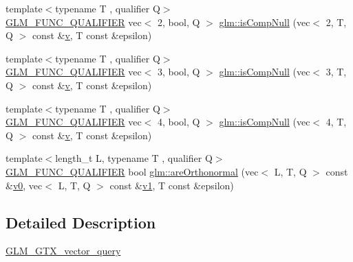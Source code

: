 \begin{DoxyCompactItemize}
\item 
{\footnotesize template$<$typename T , qualifier Q$>$ }\\\hyperlink{setup_8hpp_a33fdea6f91c5f834105f7415e2a64407}{G\+L\+M\+\_\+\+F\+U\+N\+C\+\_\+\+Q\+U\+A\+L\+I\+F\+I\+ER} vec$<$ 2, bool, Q $>$ \hyperlink{namespaceglm_aa194d2ce350422b8c307778002a5429d}{glm\+::is\+Comp\+Null} (vec$<$ 2, T, Q $>$ const \&\hyperlink{_s_d_l__opengl_8h_a10a82eabcb59d2fcd74acee063775f90}{v}, T const \&epsilon)
\item 
{\footnotesize template$<$typename T , qualifier Q$>$ }\\\hyperlink{setup_8hpp_a33fdea6f91c5f834105f7415e2a64407}{G\+L\+M\+\_\+\+F\+U\+N\+C\+\_\+\+Q\+U\+A\+L\+I\+F\+I\+ER} vec$<$ 3, bool, Q $>$ \hyperlink{namespaceglm_a3c5f0ad7464dde1b9daa5b5a9f3141ee}{glm\+::is\+Comp\+Null} (vec$<$ 3, T, Q $>$ const \&\hyperlink{_s_d_l__opengl_8h_a10a82eabcb59d2fcd74acee063775f90}{v}, T const \&epsilon)
\item 
{\footnotesize template$<$typename T , qualifier Q$>$ }\\\hyperlink{setup_8hpp_a33fdea6f91c5f834105f7415e2a64407}{G\+L\+M\+\_\+\+F\+U\+N\+C\+\_\+\+Q\+U\+A\+L\+I\+F\+I\+ER} vec$<$ 4, bool, Q $>$ \hyperlink{namespaceglm_a7d5eb6f3d09e695f134999ae0b9e0aa9}{glm\+::is\+Comp\+Null} (vec$<$ 4, T, Q $>$ const \&\hyperlink{_s_d_l__opengl_8h_a10a82eabcb59d2fcd74acee063775f90}{v}, T const \&epsilon)
\item 
{\footnotesize template$<$length\+\_\+t L, typename T , qualifier Q$>$ }\\\hyperlink{setup_8hpp_a33fdea6f91c5f834105f7415e2a64407}{G\+L\+M\+\_\+\+F\+U\+N\+C\+\_\+\+Q\+U\+A\+L\+I\+F\+I\+ER} bool \hyperlink{group__gtx__vector__query_ga1b091c3d7f9ee3b0708311c001c293e3}{glm\+::are\+Orthonormal} (vec$<$ L, T, Q $>$ const \&\hyperlink{_s_d_l__opengl__glext_8h_a7062a23d1d434121d4a88f530703d06a}{v0}, vec$<$ L, T, Q $>$ const \&\hyperlink{_s_d_l__opengl__glext_8h_a435c176a02c061b43e19bdf7c86cceae}{v1}, T const \&epsilon)
\end{DoxyCompactItemize}


\subsection{Detailed Description}
\hyperlink{group__gtx__vector__query}{G\+L\+M\+\_\+\+G\+T\+X\+\_\+vector\+\_\+query} 